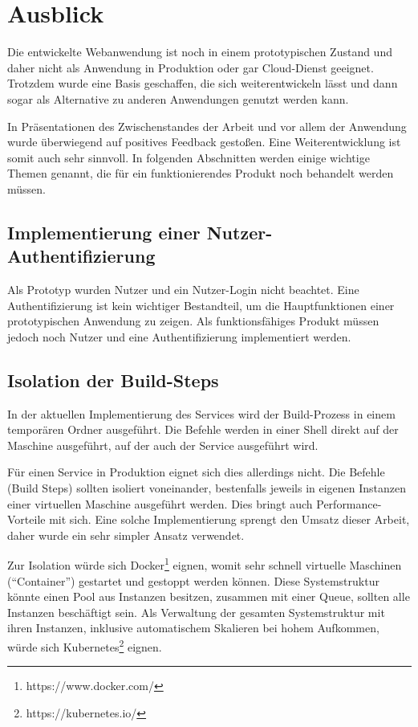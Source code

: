 \chapter{Ausblick}

Die entwickelte Webanwendung ist noch in einem prototypischen Zustand und daher nicht als Anwendung in Produktion oder gar Cloud-Dienst geeignet. Trotzdem wurde eine Basis geschaffen, die sich weiterentwickeln lässt und dann sogar als Alternative zu anderen Anwendungen genutzt werden kann.

In Präsentationen des Zwischenstandes der Arbeit und vor allem der Anwendung wurde überwiegend auf positives Feedback gestoßen. Eine Weiterentwicklung ist somit auch sehr sinnvoll. In folgenden Abschnitten werden einige wichtige Themen genannt, die für ein funktionierendes Produkt noch behandelt werden müssen.

\section{Implementierung einer Nutzer-Authentifizierung}

Als Prototyp wurden Nutzer und ein Nutzer-Login nicht beachtet. Eine Authentifizierung ist kein wichtiger Bestandteil, um die Hauptfunktionen einer prototypischen Anwendung zu zeigen. Als funktionsfähiges Produkt müssen jedoch noch Nutzer und eine Authentifizierung implementiert werden.

\section{Isolation der Build-Steps}

In der aktuellen Implementierung des Services wird der Build-Prozess in einem temporären Ordner ausgeführt. Die Befehle werden in einer Shell direkt auf der Maschine ausgeführt, auf der auch der Service ausgeführt wird.

Für einen Service in Produktion eignet sich dies allerdings nicht. Die Befehle (Build Steps) sollten isoliert voneinander, bestenfalls jeweils in eigenen Instanzen einer virtuellen Maschine ausgeführt werden. Dies bringt auch Performance-Vorteile mit sich. Eine solche Implementierung sprengt den Umsatz dieser Arbeit, daher wurde ein sehr simpler Ansatz verwendet.

Zur Isolation würde sich Docker\footnote{https://www.docker.com/} eignen, womit sehr schnell virtuelle Maschinen (``Container'') gestartet und gestoppt werden können. Diese Systemstruktur könnte einen Pool aus Instanzen besitzen, zusammen mit einer Queue, sollten alle Instanzen beschäftigt sein. Als Verwaltung der gesamten Systemstruktur mit ihren Instanzen, inklusive automatischem Skalieren bei hohem Aufkommen, würde sich Kubernetes\footnote{https://kubernetes.io/} eignen.

